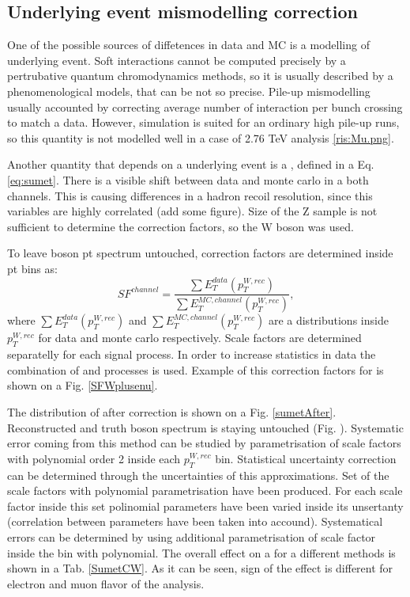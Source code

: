 \subsection{Underlying event mismodelling correction}
One of the possible sources of diffetences in data and MC is a modelling of underlying event. Soft interactions cannot be computed precisely by a pertrubative quantum chromodynamics methods, so it is usually described by a phenomenological models, that can be not so precise.  
Pile-up mismodelling usually accounted by correcting average number of interaction per bunch crossing to match a data. However, \atlas simulation is suited for an ordinary high pile-up runs, so this quantity is not modelled well in a case of 2.76 TeV analysis \ref{ris:Mu.png}. 

Another quantity that depends on a underlying event is a \sumet, defined in a Eq. \ref{eq:sumet}.   There is a visible shift between data and monte carlo in a both channels. This is causing differences in a hadron recoil resolution, since this variables are highly correlated (add some figure).  Size of the Z sample is not sufficient to determine the correction factors, so the W boson was used. 

To leave boson pt spectrum untouched, correction factors are determined inside pt bins as:
\begin{equation}
SF^{channel}=\frac{\sum E_T^{data} (p_T^{W, rec})}{\sum E_T^{MC, channel} (p_T^{W, rec})},
\end{equation}
where $\sum E_T^{data} (p_T^{W, rec})$ and $\sum E_T^{MC, channel} (p_T^{W, rec})$  are a \sumet distributions inside $p_T^{W, rec}$ for data and monte carlo respectively. Scale factors are determined separatelly for each signal process.  In order to increase statistics in data the combination of \wenu and \wmunu processes is used. Example of this correction factors for \wPlusenu is shown on a Fig. \ref{SFWplusenu}. 

The distribution of \sumet after correction is shown on a Fig. \ref{sumetAfter}. Reconstructed and truth boson spectrum is staying untouched (Fig. ).  Systematic error coming from this method can be studied by parametrisation  of scale factors with polynomial order 2 inside each $p_T^{W, rec}$ bin.  
Statistical uncertainty correction can be determined through the uncertainties of this approximations. Set of the scale factors with polynomial parametrisation have been produced. For each scale factor inside this set polinomial parameters have been varied inside its unsertanty (correlation between parameters have been taken into accound). 
Systematical errors can be determined by using additional parametrisation of scale factor inside the bin with polynomial. 
The overall effect on a \cw for a different methods is shown in a Tab. \ref{SumetCW}.  As it can be seen, sign of the effect is different for electron and muon flavor of the analysis. 
 


